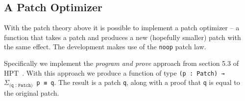 \subsection{A Patch Optimizer}\label{subsec/opt}

With the patch theory above it is possible to implement a patch optimizer --
a function that takes a patch and produces a new (hopefully smaller) patch
with the same effect. The development makes use of the \texttt{noop} patch law.

Specifically we implement the \emph{program and prove} approach from section 5.3 of HPT~\cite{Angiuli2016}.
With this approach we produce a function of type \texttt{(p : Patch) → $\Sigma_\texttt{(q : Patch)}$ p ≡ q}.
The result is a patch \texttt{q}, along with a proof that \texttt{q} is equal to the original patch.

